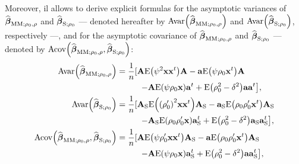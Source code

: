 Moreover, il allows to derive explicit formulas for the asymptotic variances
of $\widehat{\boldsymbol\beta}_{\mathrm{MM};\rho_{0},\rho}$ and
$\widehat{\boldsymbol\beta}_{\mathrm{S};\rho_{0}}$ --- denoted hereafter by
$\mathrm{Avar}\left(  \sthat{\boldsymbol\beta}_{\mathrm{MM};\rho_{0},\rho
}\right)  $ and $\mathrm{Avar}\left(  \sthat{\boldsymbol\beta}%
_{\mathrm{S};\rho_{0}}\right)  $, respectively ---, and for the asymptotic
covariance of $\widehat{\boldsymbol\beta}_{\mathrm{MM};\rho_{0},\rho}$ and
$\widehat{\boldsymbol\beta}_{\mathrm{S};\rho_{0}}$ --- denoted by
$\mathrm{Acov}\left(  \sthat{\boldsymbol\beta}_{\mathrm{MM};\rho_{0},\rho
},\sthat{\boldsymbol\beta}_{\mathrm{S};\rho_{0}}\right)  $:%
\begin{align}
\mathrm{Avar}\left(  \sthat{\boldsymbol\beta}_{\mathrm{MM};\rho_{0},\rho
}\right)   &  =\frac{1}{n}[\mathbf{A}\mathrm{E}\left(  \psi^{2}\mathbf{xx}%
^{t}\right)  \mathbf{A}-\mathbf{a}\mathrm{E}\left(  \psi\rho_{0}\stvec{x}%
^{t}\right)  \mathbf{A}\label{eq:Avar_betahat_MM}\\
&  \hspace*{1cm}\left.  -\mathbf{A}\mathrm{E}\left(  \psi\rho_{0}%
\stvec{x}\right)  \mathbf{a}^{t}+\mathrm{E}\left(  \rho_{0}^{2}-\delta
^{2}\right)  \mathbf{aa}^{t}\right]  ,\nonumber\\
\mathrm{Avar}\left(  \sthat{\boldsymbol\beta}_{\mathrm{S};\rho_{0}%
}\right)   &  =\frac{1}{n}[\mathbf{A}_{\mathrm{S}}\mathrm{E}\left(  \left(
\rho_{0}^{\prime}\right)  ^{2}\mathbf{xx}^{t}\right)  \mathbf{A}_{\mathrm{S}%
}-\mathbf{a}_{\mathrm{S}}\mathrm{E}\left(  \rho_{0}\rho_{0}^{\prime}%
\stvec{x}^{t}\right)  \mathbf{A}_{\mathrm{S}}\label{eq:Avar_betahat_S}\\
&  \hspace*{1cm}\left.  -\mathbf{A}_{\mathrm{S}}\mathrm{E}\left(  \rho_{0}%
\rho_{0}^{\prime}\stvec{x}\right)  \mathbf{a}_{\mathrm{S}}^{t}+\mathrm{E}%
\left(  \rho_{0}^{2}-\delta^{2}\right)  \mathbf{a}_{\mathrm{S}}\mathbf{a}%
_{\mathrm{S}}^{t}\right]  ,\nonumber\\
\mathrm{Acov}\left(  \sthat{\boldsymbol\beta}_{\mathrm{MM};\rho_{0},\rho
},\sthat{\boldsymbol\beta}_{\mathrm{S};\rho_{0}}\right)   &  =\frac{1}%
{n}[\mathbf{A}\mathrm{E}\left(  \psi\rho_{0}^{\prime}\mathbf{xx}^{t}\right)
\mathbf{A}_{\mathrm{S}}-\mathbf{a}\mathrm{E}\left(  \rho_{0}\rho_{0}^{\prime
}\stvec{x}^{t}\right)  \mathbf{A}_{\mathrm{S}}\label{eq:Acov_betahat_MM_S}\\
&  \hspace*{1cm}\left.  -\mathbf{A}\mathrm{E}\left(  \psi\rho_{0}%
\stvec{x}\right)  \mathbf{a}_{\mathrm{S}}^{t}+\mathrm{E}\left(  \rho_{0}%
^{2}-\delta^{2}\right)  \mathbf{aa}_{\mathrm{S}}^{t}\right]  ,\nonumber
\end{align}
